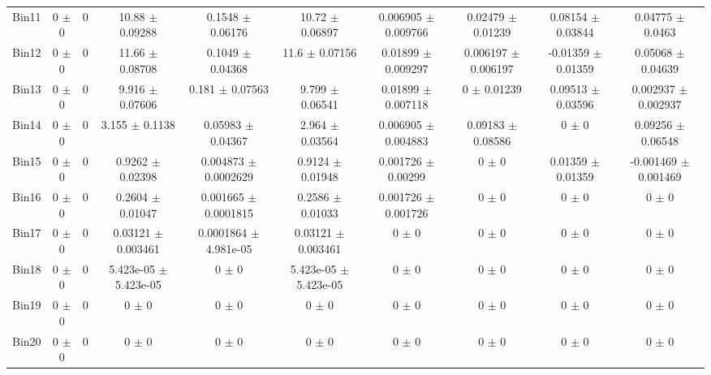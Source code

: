 \begin{tabular}{@{\extracolsep{4pt}}lccccccccc@{}}
     Bin11 & 0 $\pm$ 0 & 0 & 10.88 $\pm$ 0.09288 & 0.1548 $\pm$ 0.06176 & 10.72 $\pm$ 0.06897 & 0.006905 $\pm$ 0.009766 & 0.02479 $\pm$ 0.01239 & 0.08154 $\pm$ 0.03844 & 0.04775 $\pm$ 0.0463 \\ 
     Bin12 & 0 $\pm$ 0 & 0 & 11.66 $\pm$ 0.08708 & 0.1049 $\pm$ 0.04368 & 11.6 $\pm$ 0.07156 & 0.01899 $\pm$ 0.009297 & 0.006197 $\pm$ 0.006197 & -0.01359 $\pm$ 0.01359 & 0.05068 $\pm$ 0.04639 \\ 
     Bin13 & 0 $\pm$ 0 & 0 & 9.916 $\pm$ 0.07606 & 0.181 $\pm$ 0.07563 & 9.799 $\pm$ 0.06541 & 0.01899 $\pm$ 0.007118 & 0 $\pm$ 0.01239 & 0.09513 $\pm$ 0.03596 & 0.002937 $\pm$ 0.002937 \\ 
     Bin14 & 0 $\pm$ 0 & 0 & 3.155 $\pm$ 0.1138 & 0.05983 $\pm$ 0.04367 & 2.964 $\pm$ 0.03564 & 0.006905 $\pm$ 0.004883 & 0.09183 $\pm$ 0.08586 & 0 $\pm$ 0 & 0.09256 $\pm$ 0.06548 \\ 
     Bin15 & 0 $\pm$ 0 & 0 & 0.9262 $\pm$ 0.02398 & 0.004873 $\pm$ 0.0002629 & 0.9124 $\pm$ 0.01948 & 0.001726 $\pm$ 0.00299 & 0 $\pm$ 0 & 0.01359 $\pm$ 0.01359 & -0.001469 $\pm$ 0.001469 \\ 
     Bin16 & 0 $\pm$ 0 & 0 & 0.2604 $\pm$ 0.01047 & 0.001665 $\pm$ 0.0001815 & 0.2586 $\pm$ 0.01033 & 0.001726 $\pm$ 0.001726 & 0 $\pm$ 0 & 0 $\pm$ 0 & 0 $\pm$ 0 \\ 
     Bin17 & 0 $\pm$ 0 & 0 & 0.03121 $\pm$ 0.003461 & 0.0001864 $\pm$ 4.981e-05 & 0.03121 $\pm$ 0.003461 & 0 $\pm$ 0 & 0 $\pm$ 0 & 0 $\pm$ 0 & 0 $\pm$ 0 \\ 
     Bin18 & 0 $\pm$ 0 & 0 & 5.423e-05 $\pm$ 5.423e-05 & 0 $\pm$ 0 & 5.423e-05 $\pm$ 5.423e-05 & 0 $\pm$ 0 & 0 $\pm$ 0 & 0 $\pm$ 0 & 0 $\pm$ 0 \\ 
     Bin19 & 0 $\pm$ 0 & 0 & 0 $\pm$ 0 & 0 $\pm$ 0 & 0 $\pm$ 0 & 0 $\pm$ 0 & 0 $\pm$ 0 & 0 $\pm$ 0 & 0 $\pm$ 0 \\ 
     Bin20 & 0 $\pm$ 0 & 0 & 0 $\pm$ 0 & 0 $\pm$ 0 & 0 $\pm$ 0 & 0 $\pm$ 0 & 0 $\pm$ 0 & 0 $\pm$ 0 & 0 $\pm$ 0 \\ 
\hline\hline
  \end{tabular}
